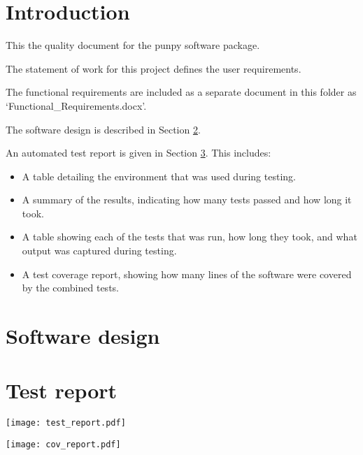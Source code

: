 \documentclass{article}
\begin{document}

\tableofcontents



\clearpage
\pagestyle{long}


\graphicspath{{images/}}
\graphicspath{{./}}

\section{Introduction}\label{introduction}

This the quality document for the punpy software package.


The statement of work for this project defines the user requirements.

The functional requirements are included as a separate document in this folder as `Functional\_Requirements.docx'.

The software design is described in Section \ref{design}.

An automated test report is given in Section \ref{testreport}. This includes:
\begin{itemize}
\item A table detailing the environment that was used during testing.
\item A summary of the results, indicating how many tests passed and how long it took.
\item A table showing each of the tests that was run, how long they took, and what output was captured during testing.
\item A test coverage report, showing how many lines of the software were covered by the combined tests.
\end{itemize}

\clearpage
\section{Software design}\label{design}



\clearpage
\section{Test report}\label{testreport}

\texttt{[image: test\_report.pdf]}



\texttt{[image: cov\_report.pdf]}



\end{document}
